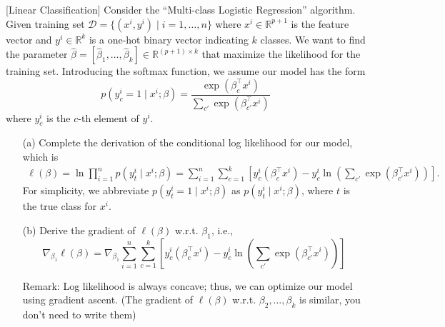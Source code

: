 \item {} [Linear Classification] Consider the ``Multi-class Logistic Regression'' algorithm. Given training set $\mathcal{D}=\{(x^i,y^i)\mid i=1,\ldots,n\}$ where $x^i\in \mathbb{R}^{p+1}$ is the feature vector and $y^i\in \mathbb{R}^{k}$ is a one-hot binary vector indicating $k$ classes. We want to find the parameter $\hat{\beta}=[\hat{\beta}_1,\ldots,\hat{\beta}_k]\in \mathbb{R}^{(p+1)\times k}$ that maximize the likelihood for the training set. Introducing the softmax function, we assume our model has the form
$$p(y_c^i=1\mid x^i;\beta) = \frac{\exp(\beta_c^\top x^i)}{\sum_{c'}\exp(\beta_{c'}^\top x^i)}$$
where $y_c^i$ is the $c$-th element of $y^i$.

\begin{itemize}
\item[(a)] Complete the derivation of the conditional log likelihood for our model, which is
\begin{align*}
    \ell(\beta) = \ln \prod_{i=1}^{n} p(y_t^i\mid x^i;\beta)
    =\sum_{i=1}^{n}\sum_{c=1}^{k}\left[ y_c^i(\beta_c^\top x^i) - y_c^i\ln \left(\sum_{c'}\exp(\beta_{c'}^\top x^i) \right)\right].
\end{align*}
For simplicity, we abbreviate $p(y_t^i=1\mid x^i;\beta)$ as $p(y_t^i\mid x^i;\beta)$, where $t$ is the true class for $x^i$.~
\item[(b)] Derive the gradient of $\ell(\beta)$ w.r.t. $\beta_1$, i.e.,
$$\nabla_{\beta_1}\ell(\beta) = \nabla_{\beta_1} \sum_{i=1}^{n}\sum_{c=1}^{k}\left[ y_c^i(\beta_c^\top x^i) - y_c^i\ln \left(\sum_{c'}\exp(\beta_{c'}^\top x^i) \right)\right]$$

Remark: Log likelihood is always concave; thus, we can optimize our model using gradient ascent. (The gradient of $\ell(\beta)$ w.r.t. $\beta_2,\ldots,\beta_k$ is similar, you don't need to write them)~
\end{itemize}

\solution













\newpage